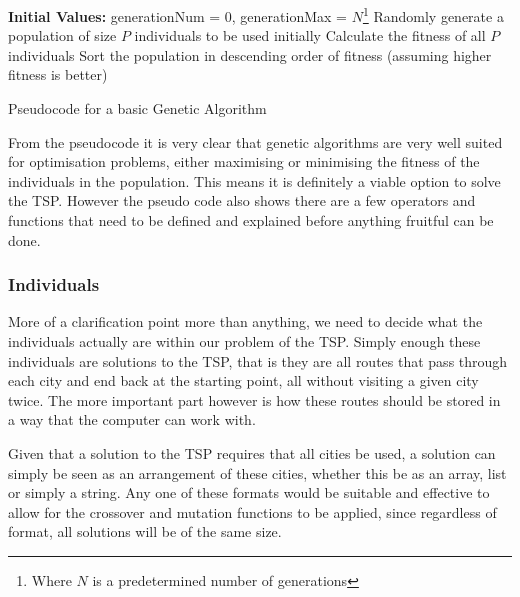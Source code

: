 \documentclass[11pt,a4paper,titlepage]{article}
\begin{document}
\begin{algorithm}[H]
\SetAlgoLined
\textbf{Initial Values:} generationNum = 0, generationMax = $N$\footnote{Where $N$ is a predetermined number of generations}\;
Randomly generate a population of size $P$ individuals to be used initially\;
Calculate the fitness of all $P$ individuals\;
Sort the population in descending order of fitness (assuming higher fitness is better)\;
\caption{Pseudocode for a basic Genetic Algorithm}
\end{algorithm}

From the pseudocode it is very clear that genetic algorithms are very well suited for optimisation problems, either maximising or minimising the fitness of the individuals in the population. This means it is definitely a viable option to solve the TSP. However the pseudo code also shows there are a few operators and functions that need to be defined and explained before anything fruitful can be done.

\subsubsection{Individuals}

More of a clarification point more than anything, we need to decide what the individuals actually are within our problem of the TSP. Simply enough these individuals are solutions to the TSP, that is they are all routes that pass through each city and end back at the starting point, all without visiting a given city twice. The more important part however is how these routes should be stored in a way that the computer can work with.

Given that a solution to the TSP requires that all cities be used, a solution can simply be seen as an arrangement of these cities, whether this be as an array, list or simply a string. Any one of these formats would be suitable and effective to allow for the crossover and mutation functions to be applied, since regardless of format, all solutions will be of the same size.
\end{document}
